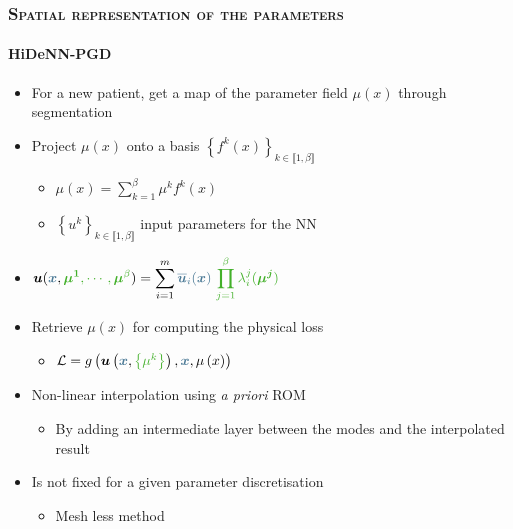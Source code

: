 \documentclass[aspectratio=1610, 10pt]{beamer}
\begin{document}
    \begin{frame}
        \frametitle{\textsc{Spatial representation of the parameters}}
        \framesubtitle{HiDeNN-PGD}
        \begin{minipage}{0.58\linewidth}
    
                \begin{itemize}
                    \item For a new patient, get a map of the parameter field $\mu\left(x\right)$ through segmentation
                    \item Project $\mu\left(x\right)$ onto a basis $\left\{f^k\left(x\right)\right\}_{k \in \llbracket 1, \beta \rrbracket}$
                    \begin{itemize}
                        \item $\mu\left(x\right) = \sum\limits_{k=1}^{\beta}\mu^{k}f^k\left(x\right)$
                        \item $\left\{u^k\right\}_{k \in \llbracket 1, \beta \rrbracket}$ input parameters for the NN
                    \end{itemize}
                    \item \small{$\displaystyle\vect{u}(\textcolor{BleuLMS!70}{\vect{x}},\textcolor{LGreenLMS}{\vect{\mu^1}, \cdots, \vect{\mu}^{\beta}}) = \sum\limits_{i=1}^m \textcolor{BleuLMS!70}{\overline{\vect{u}}_i(\vect{x})} ~\textcolor{LGreenLMS}{\prod_{j=1}^{\beta}\lambda_i^j(\vect{\mu^j})}$} 
                    \item Retrieve $\mu\left(x\right)$ for computing the physical loss 
                    \begin{itemize}
                        \item $\mathcal{L} = g\left(\vect{u}\left(\textcolor{BleuLMS!70}{\vect{x}},\textcolor{LGreenLMS}{\left\{\mu^k\right\}}\right),\textcolor{BleuLMS!70}{\vect{x}},\mu\left(x\right)\right) $
                    \end{itemize}
                    \item[\textcolor{LGreenLMS}{\faLockOpen}] Non-linear interpolation using \emph{a priori} ROM 
                    \begin{itemize}
                        \item By adding an intermediate layer between the modes and the interpolated result
                    \end{itemize}
                    \item[\textcolor{LGreenLMS}{\faLockOpen}] Is not fixed for a given parameter discretisation
                        \begin{itemize}
                            \item Mesh less method
                        \end{itemize}
                \end{itemize}
    

\end{minipage}
\end{frame}
\end{document}
